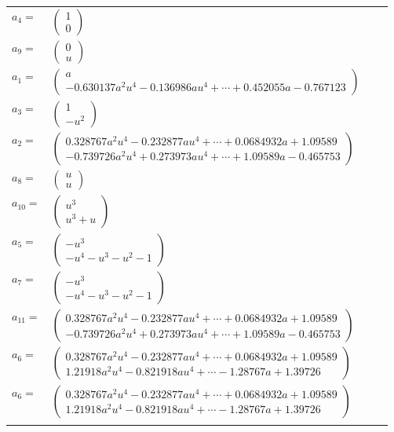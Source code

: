 \documentclass[1p]{elsarticle_modified}
\theoremstyle{definition}
\begin{document}
\begin{tabular}{m{7pt} m{180pt} m{7pt} m{180pt} }
\flushright $a_{4}=$&$\begin{pmatrix}1\\0\end{pmatrix}$ \\
\flushright $a_{9}=$&$\begin{pmatrix}0\\u\end{pmatrix}$ \\
\flushright $a_{1}=$&$\begin{pmatrix}a\\-0.630137 a^{2} u^{4}-0.136986 a u^{4}+\cdots+0.452055 a-0.767123\end{pmatrix}$ \\
\flushright $a_{3}=$&$\begin{pmatrix}1\\- u^2\end{pmatrix}$ \\
\flushright $a_{2}=$&$\begin{pmatrix}0.328767 a^{2} u^{4}-0.232877 a u^{4}+\cdots+0.0684932 a+1.09589\\-0.739726 a^{2} u^{4}+0.273973 a u^{4}+\cdots+1.09589 a-0.465753\end{pmatrix}$ \\
\flushright $a_{8}=$&$\begin{pmatrix}u\\u\end{pmatrix}$ \\
\flushright $a_{10}=$&$\begin{pmatrix}u^3\\u^3+u\end{pmatrix}$ \\
\flushright $a_{5}=$&$\begin{pmatrix}- u^3\\- u^4- u^3- u^2-1\end{pmatrix}$ \\
\flushright $a_{7}=$&$\begin{pmatrix}- u^3\\- u^4- u^3- u^2-1\end{pmatrix}$ \\
\flushright $a_{11}=$&$\begin{pmatrix}0.328767 a^{2} u^{4}-0.232877 a u^{4}+\cdots+0.0684932 a+1.09589\\-0.739726 a^{2} u^{4}+0.273973 a u^{4}+\cdots+1.09589 a-0.465753\end{pmatrix}$ \\
\flushright $a_{6}=$&$\begin{pmatrix}0.328767 a^{2} u^{4}-0.232877 a u^{4}+\cdots+0.0684932 a+1.09589\\1.21918 a^{2} u^{4}-0.821918 a u^{4}+\cdots-1.28767 a+1.39726\end{pmatrix}$\\ \flushright $a_{6}=$&$\begin{pmatrix}0.328767 a^{2} u^{4}-0.232877 a u^{4}+\cdots+0.0684932 a+1.09589\\1.21918 a^{2} u^{4}-0.821918 a u^{4}+\cdots-1.28767 a+1.39726\end{pmatrix}$\\&\end{tabular}
\end{document}
